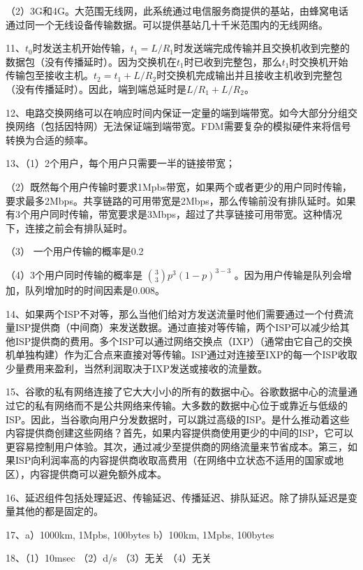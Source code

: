 \documentclass[11pt,UTF8,twoside]{article}
\begin{document}
    （2）3G和4G。大范围无线网，此系统通过电信服务商提供的基站，由蜂窝电话通过同一个无线设备传输数据。可以提供基站几十千米范围内的无线网络。
    
    11、$t_0$时发送主机开始传输，$t_1=L/R_1$时发送端完成传输并且交换机收到完整的数据包（没有传播延时）。因为交换机在$t_1$时已收到完整包，那么$t_1$时交换机开始传输包至接收主机。$t_2=t_1+L/R_2$时交换机完成输出并且接收主机收到完整包（没有传播延时）。因此，端到端总延时是$L/R_1+L/R_2$。
    
    12、电路交换网络可以在响应时间内保证一定量的端到端带宽。如今大部分分组交换网络（包括因特网）无法保证端到端带宽。FDM需要复杂的模拟硬件来将信号转换为合适的频率。
    
    13、（1）2个用户，每个用户只需要一半的链接带宽；
    
    （2）既然每个用户传输时要求1Mpbs带宽，如果两个或者更少的用户同时传输，要求最多2Mbps。共享链路的可用带宽是2Mbps，那么传输前没有排队延时。如果有3个用户同时传输，带宽要求是3Mbps，超过了共享链接可用带宽。这种情况下，连接之前会有排队延时。
    
    （3） 一个用户传输的概率是0.2
    
    （4）3个用户同时传输的概率是 $\binom{3}{3} p^{3} (1-p)^{3-3}$ 。因为用户传输是队列会增加，队列增加时的时间因素是0.008。
    
    14、如果两个ISP不对等，那么当他们给对方发送流量时他们需要通过一个付费流量ISP提供商（中间商）来发送数据。通过直接对等传输，两个ISP可以减少给其他ISP提供商的费用。多个ISP可以通过网络交换点（IXP）（通常由它自己的交换机单独构建）作为汇合点来直接对等传输。ISP通过对连接至IXP的每一个ISP收取少量费用来盈利，当然利润取决于IXP发送或接收的流量数。
    
    15、谷歌的私有网络连接了它大大小小的所有的数据中心。谷歌数据中心的流量通过它的私有网络而不是公共网络来传输。大多数的数据中心位于或靠近与低级的ISP。因此，当谷歌向用户分发数据时，可以跳过高级的ISP。是什么推动着这些内容提供商创建这些网络？首先，如果内容提供商使用更少的中间的ISP，它可以更容易控制用户体验。其次，通过减少至提供商的网络流量来节省成本。第三，如果ISP向利润率高的内容提供商收取高费用（在网络中立状态不适用的国家或地区），内容提供商可以避免额外成本。
    
    16、延迟组件包括处理延迟、传输延迟、传播延迟、排队延迟。除了排队延迟是变量其他的都是固定的。
    
    17、a）1000km, 1Mpbs, 100bytes
    b）100km, 1Mpbs, 100bytes
    
    18、（1）10msec
    （2）d/s
    （3）无关
    （4）无关
    
\end{document}
